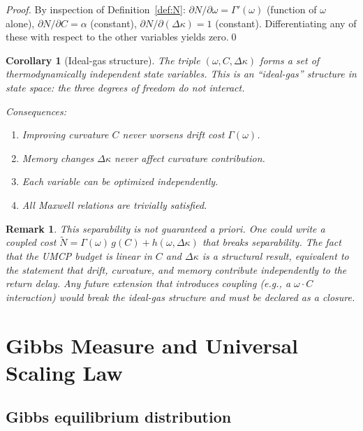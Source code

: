 \documentclass[
  aps,
  prd,
  twocolumn,
  showpacs,
  superscriptaddress,
  nofootinbib,
  floatfix
]{revtex4-2}
\newtheorem{corollary}[theorem]{Corollary}
\newtheorem{remark}{Remark}
\newcommand{\Gam}{\Gamma}
\begin{document}
\begin{proof}
By inspection of Definition~\ref{def:N}:
$\partial N/\partial\omega = \Gam'(\omega)$ (function of $\omega$
alone), $\partial N/\partial C = \alpha$ (constant),
$\partial N/\partial(\Delta\kappa) = 1$ (constant).
Differentiating any of these with respect to the other variables
yields zero.\qed
\end{proof}

\begin{corollary}[Ideal-gas structure]
The triple $(\omega,C,\Delta\kappa)$ forms a set of
\emph{thermodynamically independent} state variables.
This is an ``ideal-gas'' structure in state space: the three
degrees of freedom do not interact.

\noindent Consequences:
\begin{enumerate}
  \item Improving curvature $C$ never worsens drift cost $\Gam(\omega)$.
  \item Memory changes $\Delta\kappa$ never affect curvature contribution.
  \item Each variable can be optimized independently.
  \item All Maxwell relations are trivially satisfied.
\end{enumerate}
\end{corollary}

\begin{remark}
This separability is not guaranteed \emph{a priori}.
One could write a coupled cost
$\widetilde{N}=\Gam(\omega)\,g(C)+h(\omega,\Delta\kappa)$
that breaks separability.  The fact that the UMCP budget is
\emph{linear} in $C$ and $\Delta\kappa$ is a structural result,
equivalent to the statement that drift, curvature, and memory
contribute independently to the return delay.
Any future extension that introduces coupling (e.g., a
$\omega\cdot C$ interaction) would break the ideal-gas
structure and must be declared as a closure.
\end{remark}

\section{Gibbs Measure and Universal Scaling Law}
\label{sec:scaling}

\subsection{Gibbs equilibrium distribution}
\end{document}
